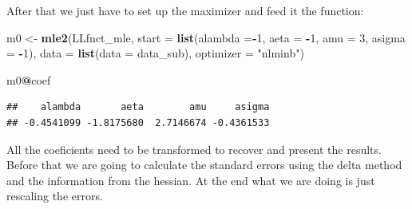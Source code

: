 \documentclass[]{book}
\newenvironment{Shaded}{\begin{snugshade}}{\end{snugshade}}
\newcommand{\KeywordTok}[1]{\textcolor[rgb]{0.13,0.29,0.53}{\textbf{#1}}}
\newcommand{\DataTypeTok}[1]{\textcolor[rgb]{0.13,0.29,0.53}{#1}}
\newcommand{\DecValTok}[1]{\textcolor[rgb]{0.00,0.00,0.81}{#1}}
\newcommand{\StringTok}[1]{\textcolor[rgb]{0.31,0.60,0.02}{#1}}
\newcommand{\OperatorTok}[1]{\textcolor[rgb]{0.81,0.36,0.00}{\textbf{#1}}}
\newcommand{\NormalTok}[1]{#1}
\begin{document}
After that we just have to set up the maximizer and feed it the
function:

\begin{Shaded}
\begin{Highlighting}[]
\NormalTok{m0 <-}\StringTok{ }\KeywordTok{mle2}\NormalTok{(LLfnct_mle, }
           \DataTypeTok{start =} \KeywordTok{list}\NormalTok{(}\DataTypeTok{alambda =}\OperatorTok{-}\DecValTok{1}\NormalTok{,}
                        \DataTypeTok{aeta =} \OperatorTok{-}\DecValTok{1}\NormalTok{, }
                        \DataTypeTok{amu =} \DecValTok{3}\NormalTok{,}
                        \DataTypeTok{asigma =} \OperatorTok{-}\DecValTok{1}\NormalTok{), }
           \DataTypeTok{data =} \KeywordTok{list}\NormalTok{(}\DataTypeTok{data =}\NormalTok{ data_sub),}
           \DataTypeTok{optimizer =} \StringTok{"nlminb"}\NormalTok{)}

\NormalTok{m0}\OperatorTok{@}\NormalTok{coef}
\end{Highlighting}
\end{Shaded}

\begin{verbatim}
##    alambda       aeta        amu     asigma
## -0.4541099 -1.8175680  2.7146674 -0.4361533
\end{verbatim}

All the coeficients need to be transformed to recover and present the
results. Before that we are going to calculate the standard errors using
the delta method and the information from the hessian. At the end what
we are doing is just rescaling the errors.

\begin{Shaded}
\end{Shaded}
\end{document}
